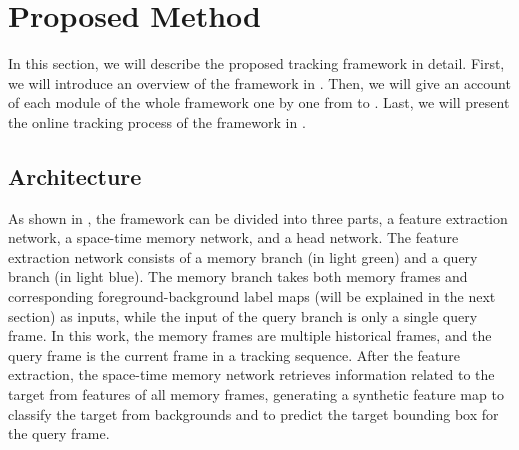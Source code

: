 \documentclass[final]{cvpr}
\begin{document}
\section{Proposed Method}
In this section, we will describe the proposed tracking framework in detail.
First, we will introduce an overview of the framework in .
Then, we will give an account of each module of the whole framework one by one from  to .
Last, we will present the online tracking process of the framework in .

\subsection{Architecture}\label{subsec:architecture}
As shown in , the framework can be divided into three parts, a feature extraction network, a space-time memory network, and a head network.
The feature extraction network consists of a memory branch (in \textcolor{color_memory_branch}{light green}) and a query branch (in \textcolor{color_query_branch}{light blue}).
The memory branch takes both memory frames and corresponding foreground-background label maps (will be explained in the next section) as inputs, while the input of the query branch is only a single query frame.
In this work, the memory frames are multiple historical frames, and the query frame is the current frame in a tracking sequence.
After the feature extraction, the space-time memory network retrieves information related to the target from features of all memory frames, generating a synthetic feature map to classify the target from backgrounds and to predict the target bounding box for the query frame.

\end{document}
